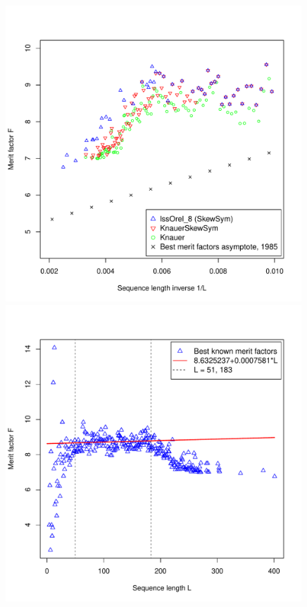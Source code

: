 \begin{figure}[t!]
\begin{minipage}{0.49\textwidth}
\vspace*{-5ex}%
\end{minipage}
~%
\begin{minipage}{0.49\textwidth}
\includegraphics[width=0.99\textwidth]{fg-R-labs-wide-4-figures-c}
\end{minipage}
%
\begin{minipage}{0.49\textwidth}
\includegraphics[width=0.99\textwidth]{fg-R-labs-wide-4-figures-d}

\end{minipage}
\end{figure}
